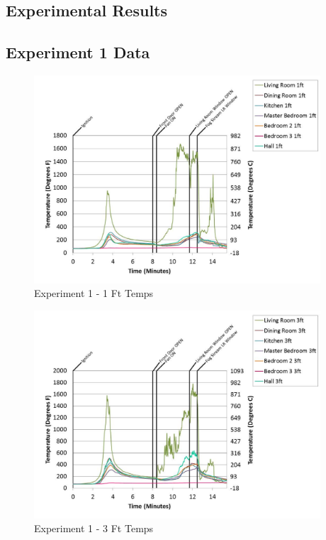 \documentclass{article}
\begin{document}
\tableofcontents

\begin{appendices}


\section{Experimental Results}
\clearpage		\large
\subsection{Experiment 1 Data} \label{App:Exp1Results} 

	\begin{figure}[h!]
		\centering
		\includegraphics[height=3.05in]{0_Images/Results_Charts/Exp_1_Charts/1FtTemps.pdf}
		\caption{Experiment 1 - 1 Ft Temps}
	\end{figure}
 

	\begin{figure}[h!]
		\centering
		\includegraphics[height=3.05in]{0_Images/Results_Charts/Exp_1_Charts/3FtTemps.pdf}
		\caption{Experiment 1 - 3 Ft Temps}
	\end{figure}
 

\end{appendices}
\end{document}
